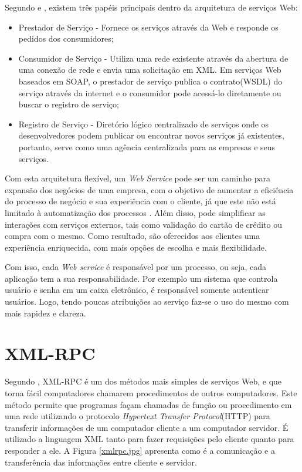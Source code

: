 Segundo \cite{ethan} e \cite{naveen}, existem três papéis principais dentro da arquitetura de serviços Web:
\begin{itemize}
 \item Prestador de Serviço - Fornece os serviços através da Web e responde os pedidos dos consumidores;
 \item Consumidor de Serviço - Utiliza uma rede existente através da abertura de uma conexão de rede e envia uma solicitação em XML. Em serviços Web baseados em SOAP, o prestador de serviço publica o contrato(WSDL) do serviço através da internet e o consumidor pode acessá-lo diretamente ou buscar o registro de serviço;
 \item Registro de Serviço - Diretório lógico centralizado de serviços onde os desenvolvedores podem publicar ou encontrar novos serviços já existentes, portanto, serve como uma agência centralizada para as empresas e seus serviços.
\end{itemize}

Com esta arquitetura flexível, um \textit{Web Service} pode ser um caminho para expansão dos negócios de uma empresa, com o objetivo de aumentar a eficiência do processo de negócio e sua experiência com o cliente, já que este não está limitado à automatização dos processos \cite{singh}. Além disso, pode simplificar as interações com serviços externos, tais como validação do cartão de crédito ou compra com o mesmo. Como resultado, são oferecidos aos clientes uma experiência enriquecida, com mais opções de escolha e mais flexibilidade. 

Com isso, cada \textit{Web service} é responsável por um processo, ou seja, cada aplicação tem a sua responsabilidade. Por exemplo um sistema que controla usuário e senha em um caixa eletrônico, é responsável somente autenticar usuários. Logo, tendo poucas atribuições ao serviço faz-se o uso do mesmo com mais rapidez e clareza.

\section{XML-RPC}
Segundo \cite{laurent}, XML-RPC é um dos métodos mais simples de serviços Web, e que torna fácil computadores chamarem procedimentos de outros computadores. Este método permite que programas façam chamadas de função ou procedimento em uma rede utilizando o protocolo \textit{Hypertext Transfer Protocol}(HTTP) para transferir informações de um computador cliente a um computador servidor. É utilizado a linguagem XML tanto para fazer requisições pelo cliente quanto para responder a ele. A Figura \ref{xmlrpc.jpg} apresenta como é a comunicação e a transferência das informações entre cliente e servidor.

